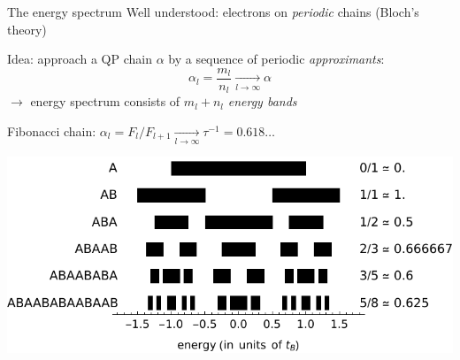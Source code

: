 \documentclass[xcolor=x11names,compress,professionalfonts]{beamer}
\renewcommand{\(}{\begin{columns}}
\renewcommand{\)}{\end{columns}}
\newcommand{\<}[1]{\begin{column}{#1}}
\renewcommand{\>}{\end{column}}
\begin{document}

\begin{frame}{The energy spectrum}
Well understood: electrons on \emph{periodic} chains (Bloch's theory)

Idea: approach a QP chain $\alpha$ by a sequence of periodic \emph{approximants}:
\[
	\alpha_l = \frac{m_l}{n_l} \xrightarrow[l \to \infty]{} \alpha
\]
$\rightarrow$ energy spectrum consists of $m_l + n_l$ \emph{energy bands}

Fibonacci chain: $\alpha_l = F_{l}/F_{l+1} \xrightarrow[l \to \infty]{} \tau^{-1} = 0.618\dots$

{\centering
\includegraphics[scale=.8]{img/energy_bands.pdf}

}

\end{frame}
\end{document}
